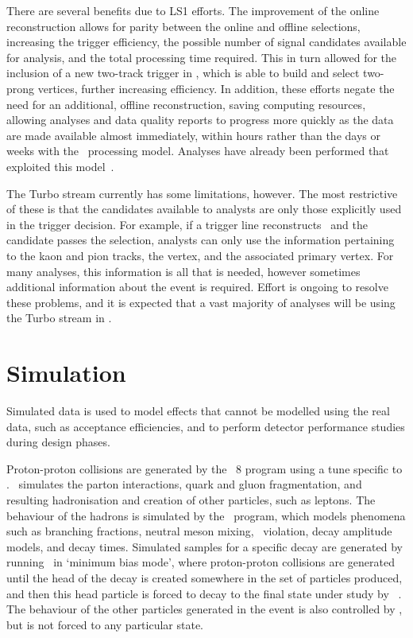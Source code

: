 There are several benefits due to \ac{LS1} efforts.
The improvement of the online reconstruction allows for parity between the 
online and offline selections, increasing the trigger efficiency, the possible 
number of signal candidates available for analysis, and the total processing 
time required.
This in turn allowed for the inclusion of a new two-track trigger in \hltone, 
which is able to build and select two-prong vertices, further increasing 
efficiency.
In addition, these efforts negate the need for an additional, offline 
reconstruction, saving computing resources,
 allowing analyses and data quality reports to progress more quickly as the 
 data are made available almost immediately, within hours rather than the days 
 or weeks with the \runone\ processing model.
 Analyses have already been performed that exploited this 
 model~\cite{LHCb-PAPER-2015-037,Aaij:2015bpa}.

 The Turbo stream currently has some limitations, however.
 The most restrictive of these is that the candidates available to analysts are 
 only those explicitly used in the trigger decision.
 For example, if a trigger line reconstructs \DzToKpi\ and the candidate passes 
 the selection, analysts can only use the information pertaining to the kaon 
 and pion tracks, the \PDzero vertex, and the associated primary vertex.
 For many analyses, this information is all that is needed, however sometimes 
 additional information about the event is required.
 Effort is ongoing to resolve these problems, and it is expected that a vast 
 majority of analyses will be using the Turbo stream in \runthree.

\section{Simulation}
\label{chap:intro:lhcb:simulation}

Simulated data is used to model effects that cannot be modelled using the real 
data, such as acceptance efficiencies, and to perform detector performance 
studies during design phases.

Proton-proton collisions are generated by the \pythia\ 8 program using a tune 
specific to \lhcb.
\pythia\ simulates the parton interactions, quark and gluon fragmentation, and 
resulting hadronisation and creation of other particles, such as leptons.
The behaviour of the hadrons is simulated by the \evtgen\ program, which models 
phenomena such as branching fractions, neutral meson mixing, \CP\ violation, 
decay amplitude models, and decay times.
Simulated samples for a specific decay are generated by running \pythia\ in 
`minimum bias mode', where proton-proton collisions are generated until the 
head of the decay is created somewhere in the set of particles produced, and 
then this head particle is forced to decay to the final state under study by 
\evtgen~\cite{Clemencic:2011zza}.
The behaviour of the other particles generated in the event is also controlled 
by \evtgen, but is not forced to any particular state.

